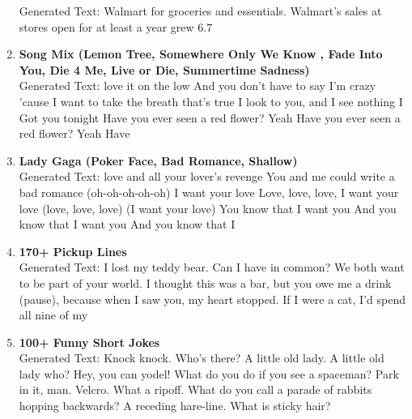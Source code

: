 \documentclass[11pt]{article}
\begin{document}
\begin{enumerate}
  Generated Text: Walmart for groceries and essentials.  Walmart’s sales at stores open for at least a year grew 6.7%
  \item \textbf{Song Mix (Lemon Tree, Somewhere Only We Know
, Fade Into You, Die 4 Me, Live or Die, Summertime Sadness)}\\
Generated Text: love it on the low And you don't have to say I'm crazy 'cause I want to take the breath that's true I look to you, and I see nothing I Got you tonight Have you ever seen a red flower? Yeah Have you ever seen a red flower? Yeah Have
  \item \textbf{Lady Gaga (Poker Face, Bad Romance, Shallow)}\\
Generated Text: love and all your lover's revenge You and me could write a bad romance (oh-oh-oh-oh-oh) I want your love Love, love, love, I want your love (love, love, love) (I want your love) You know that I want you And you know that I want you And you know that I
  \item \textbf{170+ Pickup Lines}\\
  Generated Text: I lost my teddy bear. Can I have in common? We both want to be part of your world. I thought this was a bar, but you owe me a drink (pause), because when I saw you, my heart stopped. If I were a cat, I’d spend all nine of my
  \item \textbf{100+ Funny Short Jokes}\\
  Generated Text: Knock knock. Who's there? A little old lady. A little old lady who? Hey, you can yodel! What do you do if you see a spaceman? Park in it, man. Velcro. What a ripoff. What do you call a parade of rabbits hopping backwards? A receding hare-line. What is sticky hair?

\end{enumerate}
\end{document}
